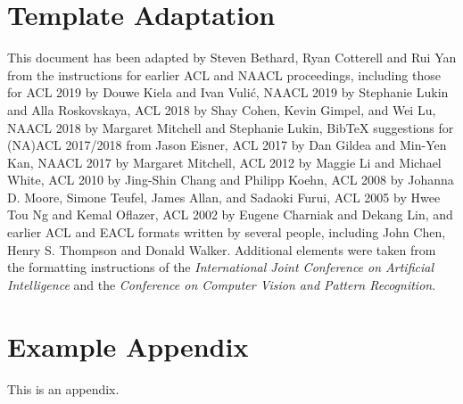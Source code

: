 \documentclass[9pt]{article}
\begin{document}
\section{Template Adaptation}

This document has been adapted
by Steven Bethard, Ryan Cotterell and Rui Yan
from the instructions for earlier ACL and NAACL proceedings, including those for 
ACL 2019 by Douwe Kiela and Ivan Vuli\'{c},
NAACL 2019 by Stephanie Lukin and Alla Roskovskaya, 
ACL 2018 by Shay Cohen, Kevin Gimpel, and Wei Lu, 
NAACL 2018 by Margaret Mitchell and Stephanie Lukin,
Bib\TeX{} suggestions for (NA)ACL 2017/2018 from Jason Eisner,
ACL 2017 by Dan Gildea and Min-Yen Kan, 
NAACL 2017 by Margaret Mitchell, 
ACL 2012 by Maggie Li and Michael White, 
ACL 2010 by Jing-Shin Chang and Philipp Koehn, 
ACL 2008 by Johanna D. Moore, Simone Teufel, James Allan, and Sadaoki Furui, 
ACL 2005 by Hwee Tou Ng and Kemal Oflazer, 
ACL 2002 by Eugene Charniak and Dekang Lin, 
and earlier ACL and EACL formats written by several people, including
John Chen, Henry S. Thompson and Donald Walker.
Additional elements were taken from the formatting instructions of the \emph{International Joint Conference on Artificial Intelligence} and the \emph{Conference on Computer Vision and Pattern Recognition}.




\appendix

\section{Example Appendix}
\label{sec:appendix}

This is an appendix.
\end{document}

